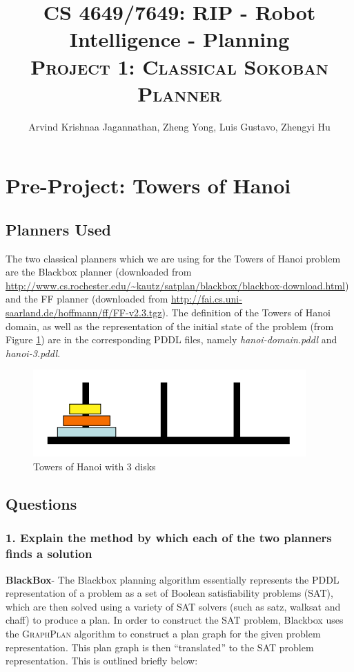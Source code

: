 \documentclass[10pt, letter]{article}
\newcommand{\doctitle}{%
CS 4649/7649: RIP - Robot Intelligence - Planning}
\begin{document}
\title{\textbf{\doctitle} \\\textsc{Project 1: Classical Sokoban Planner}}
  \author {Arvind Krishnaa Jagannathan, Zheng Yong, Luis Gustavo, Zhengyi Hu}%
   \date{}
\maketitle

\section{Pre-Project: Towers of Hanoi}
\subsection*{Planners Used}
The two classical planners which we are using for the Towers of Hanoi problem are the Blackbox planner \cite{kautz1998blackbox} (downloaded from \url{http://www.cs.rochester.edu/~kautz/satplan/blackbox/blackbox-download.html}) and the FF planner \cite{hoffmann2001fast} (downloaded from \url{http://fai.cs.uni-saarland.de/hoffmann/ff/FF-v2.3.tgz}). The definition of the Towers of Hanoi domain, as well as the representation of the initial state of the problem (from Figure \ref{fig1}) are in the corresponding PDDL files, namely \textit{hanoi-domain.pddl} and \textit{hanoi-3.pddl}.

\begin{figure}[h!]
  \centering
    \includegraphics[scale = 0.3]{images/hanoi1}
    \caption{Towers of Hanoi with 3 disks}
  \label{fig1}
\end{figure}

\subsection{Questions}
\subsubsection*{1. Explain the method by which each of the two planners finds a solution}
\textbf{BlackBox}- The Blackbox planning algorithm essentially represents the PDDL representation of a problem as a set of Boolean satisfiability problems (SAT), which are then solved using a variety of SAT solvers (such as satz, walksat and chaff) to produce a plan.
In order to construct the SAT problem, Blackbox uses the \textsc{GraphPlan} algorithm to construct a plan graph for the given problem representation. This plan graph is then ``translated'' to the SAT problem representation. This is outlined briefly below:
\end{document}
